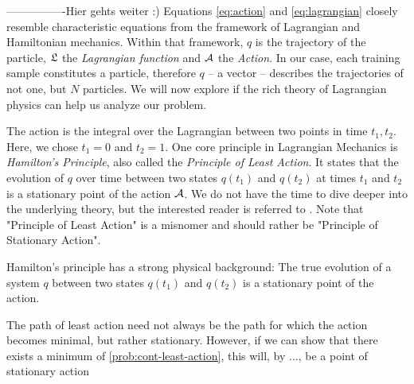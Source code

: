----------------Hier gehts weiter :)
Equations \ref{eq:action} and \ref{eq:lagrangian} closely resemble characteristic equations from the framework of Lagrangian and Hamiltonian mechanics.
Within that framework, $q$ is the trajectory of the particle, $\mathfrak{L}$ the \emph{Lagrangian function} and $\mathcal{A}$ the \emph{Action}.
In our case, each training sample constitutes a particle, therefore $q$ -- a vector -- describes the trajectories of not one, but $N$ particles.
We will now explore if the rich theory of Lagrangian physics can help us analyze our problem.

The action is the integral over the Lagrangian between two points in time $t_1, t_2$.
Here, we chose $t_1 = 0$ and $t_2 = 1$.
One core principle in Lagrangian Mechanics is \emph{Hamilton's Principle}, also called the \emph{Principle of Least Action}.
It states that
the evolution of $q$ over time between two states $q(t_1)$ and $q(t_2)$ at times $t_1$ and $t_2$ is a stationary point of the action $\mathcal{A}$.
We do not have the time to dive deeper into the underlying theory, but the interested reader is referred to .
Note that "Principle of Least Action" is a misnomer and should rather be "Principle of Stationary Action".


Hamilton's principle has a strong physical background:
The true evolution of a system $q$ between two states $q(t_1)$ and $q(t_2)$ is a stationary point of the action.

The path of least action need not always be the path for which the action becomes minimal, but rather stationary.
However, if we can show that there exists a minimum of \cref{prob:cont-least-action}, this will, by ..., be a point of stationary action


